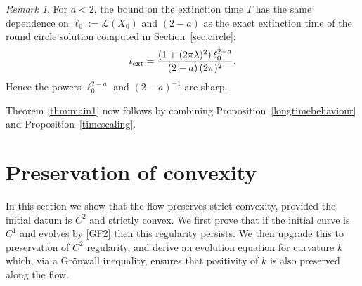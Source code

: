 \documentclass[a4paper,11pt]{amsart}
\theoremstyle{definition}\newtheorem*{definition}{Definition}
\theoremstyle{definition} \newtheorem{proposition}[theorem]{Proposition}
\theoremstyle{definition}\newtheorem{lemma}[theorem]{Lemma}
\theoremstyle{definition}\newtheorem{corollary}[theorem]{Corollary}
\theoremstyle{definition}\newtheorem{example}{Example}
\theoremstyle{remark}\newtheorem*{remark}{Remark}
\def\length{\mathcal L}
\begin{document}
\begin{remark}
For $a<2$, the bound on the extinction time $T$ has the same dependence on $\ell_0:=\length(X_0)$ and $(2-a)$ as the exact extinction time of the round circle solution computed in Section~\ref{sec:circle}: 
\[
t_{\rm ext}=\frac{(1+(2\pi\lambda)^2)\,\ell_0^{2-a}}{(2-a)\,(2\pi)^{2}}.
\]
Hence the powers $\ell_0^{2-a}$ and $(2-a)^{-1}$ are sharp.
\end{remark}


Theorem \ref{thm:main1} now follows by combining Proposition~\ref{longtimebehaviour} and Proposition~\ref{timescaling}.

\section{Preservation of convexity}
\label{sec:convex}

In this section we show that the flow preserves strict convexity, 
provided the initial datum is $C^2$ and strictly convex. We first prove that if the initial curve is $C^1$ and evolves by \eqref{GF2} then this regularity persists. We then upgrade this to preservation of $C^2$ regularity, and derive an evolution equation for curvature $k$ which, via a Gr\"onwall inequality, ensures that positivity of $k$ is also preserved along the flow. 
\end{document}

